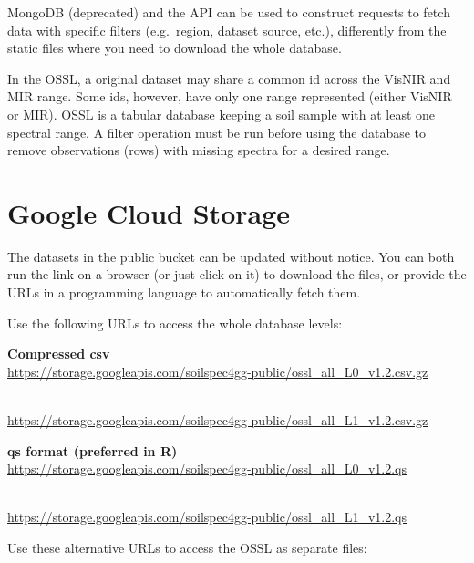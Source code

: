 \documentclass[
  letterpaper,
  DIV=11,
  numbers=noendperiod]{scrreprt}
\begin{document}
MongoDB (deprecated) and the API can be used to construct requests to
fetch data with specific filters (e.g.~region, dataset source, etc.),
differently from the static files where you need to download the whole
database.

\begin{tcolorbox}[enhanced jigsaw, title=\textcolor{quarto-callout-tip-color}{\faLightbulb}\hspace{0.5em}{Tip}, rightrule=.15mm, coltitle=black, opacityback=0, bottomrule=.15mm, colframe=quarto-callout-tip-color-frame, breakable, arc=.35mm, titlerule=0mm, toptitle=1mm, left=2mm, colback=white, toprule=.15mm, leftrule=.75mm, bottomtitle=1mm, opacitybacktitle=0.6, colbacktitle=quarto-callout-tip-color!10!white]

In the OSSL, a original dataset may share a common id across the VisNIR
and MIR range. Some ids, however, have only one range represented
(either VisNIR or MIR). OSSL is a tabular database keeping a soil sample
with at least one spectral range. A filter operation must be run before
using the database to remove observations (rows) with missing spectra
for a desired range.

\end{tcolorbox}

\section{Google Cloud Storage}\label{google-cloud-storage}

The datasets in the public bucket can be updated without notice. You can
both run the link on a browser (or just click on it) to download the
files, or provide the URLs in a programming language to automatically
fetch them.

Use the following URLs to access the whole database levels:

\textbf{Compressed csv}\\
\url{https://storage.googleapis.com/soilspec4gg-public/ossl_all_L0_v1.2.csv.gz}\strut \\
\url{https://storage.googleapis.com/soilspec4gg-public/ossl_all_L1_v1.2.csv.gz}

\textbf{qs format (preferred in R)}\\
\url{https://storage.googleapis.com/soilspec4gg-public/ossl_all_L0_v1.2.qs}\strut \\
\url{https://storage.googleapis.com/soilspec4gg-public/ossl_all_L1_v1.2.qs}

Use these alternative URLs to access the OSSL as separate files:
\end{document}
